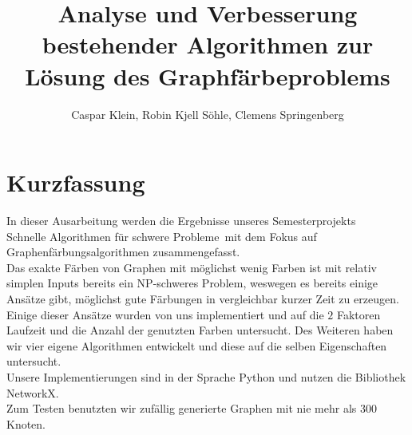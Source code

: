 \documentclass[11pt]{article}
\title{Analyse und Verbesserung bestehender Algorithmen zur Lösung des Graphfärbeproblems}
\author{Caspar Klein, Robin Kjell Söhle, Clemens Springenberg}
\begin{document}
\newlength{\stdwidth}
\setlength{\stdwidth}{0.6\linewidth}
\maketitle

\tableofcontents
\newpage

\section{Kurzfassung} %

In dieser Ausarbeitung werden die Ergebnisse unseres Semesterprojekts\\
\grqq Schnelle Algorithmen für schwere Probleme\grqq\ mit dem Fokus auf
Graphenfärbungsalgorithmen zusammengefasst. \\ 
Das exakte Färben von Graphen mit möglichst wenig Farben ist mit relativ simplen Inputs bereits ein NP-schweres Problem, weswegen es bereits einige Ansätze gibt,
möglichst gute Färbungen in vergleichbar kurzer Zeit zu erzeugen. Einige dieser Ansätze wurden von uns implementiert und auf die $2$ Faktoren 
Laufzeit und die Anzahl der genutzten Farben untersucht.
Des Weiteren haben wir vier eigene Algorithmen entwickelt und diese auf die selben Eigenschaften untersucht. \\
Unsere Implementierungen sind in der Sprache Python und nutzen die Bibliothek NetworkX. \\
Zum Testen benutzten wir zufällig generierte Graphen mit nie mehr als $300$ Knoten. 
\end{document}
